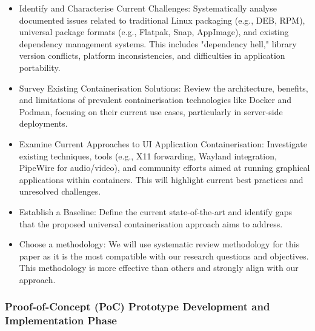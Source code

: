 \documentclass[journal,onecolumn]{IEEEtran}
\begin{document}
\begin{itemize}

    \item Identify and Characterise Current Challenges: Systematically analyse documented issues related to traditional Linux packaging (e.g., DEB, RPM), universal package formats (e.g., Flatpak, Snap, AppImage), and existing dependency management systems. This includes "dependency hell," library version conflicts, platform inconsistencies, and difficulties in application portability. 
    \item Survey Existing Containerisation Solutions: Review the architecture, benefits, and limitations of prevalent containerisation technologies like Docker and Podman, focusing on their current use cases, particularly in server-side deployments. 
    \item Examine Current Approaches to UI Application Containerisation: Investigate existing techniques, tools (e.g., X11 forwarding, Wayland integration, PipeWire for audio/video), and community efforts aimed at running graphical applications within containers. This will highlight current best practices and unresolved challenges. 
    \item Establish a Baseline: Define the current state-of-the-art and identify gaps that the proposed universal containerisation approach aims to address. 
    \item Choose a methodology: We will use systematic review methodology for this paper as it is the most compatible with our research questions and objectives. This methodology is more effective than others and strongly align with our approach.

\end{itemize}

\subsubsection{Proof-of-Concept (PoC) Prototype Development and Implementation Phase}
\end{document}
